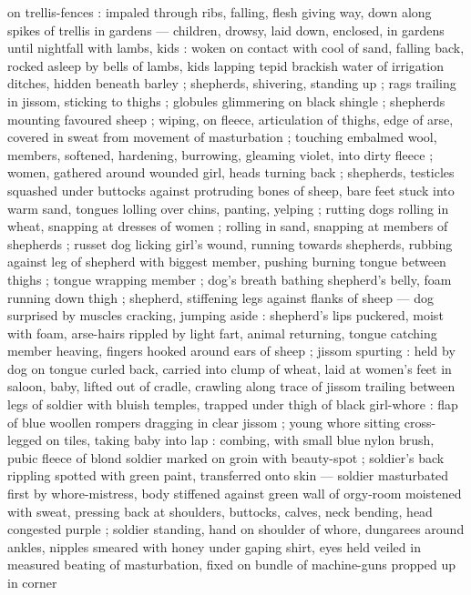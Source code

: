 on trellis-fences : impaled through ribs, falling, flesh giving way, down along spikes of trellis in
gardens --- children, drowsy, laid down, enclosed, in gardens until nightfall with lambs, kids :
woken on contact with cool of sand, falling back, rocked asleep by bells of lambs, kids lapping
tepid brackish water of irrigation ditches, hidden beneath barley ; shepherds, shivering, standing
up ; rags trailing in jissom, sticking to thighs ; globules glimmering on black shingle ; shepherds
mounting favoured sheep ; wiping, on fleece, articulation of thighs, edge of arse, covered in sweat
from movement of masturbation ; touching embalmed wool, members, softened, hardening, burrowing,
gleaming violet, into dirty fleece ; women, gathered around wounded girl, heads turning back ;
shepherds, testicles squashed under buttocks against protruding bones of sheep, bare feet stuck into
warm sand, tongues lolling over chins, panting, yelping ; rutting dogs rolling in wheat, snapping at
dresses of women ; rolling in sand, snapping at members of shepherds ; russet dog licking girl's
wound, running towards shepherds, rubbing %
against leg of shepherd with biggest member, pushing burning tongue between thighs ; tongue wrapping
member ; dog's breath bathing shepherd's belly, foam running down thigh ; shepherd, stiffening legs
against flanks of sheep --- dog surprised by muscles cracking, jumping aside : shepherd's lips
puckered, moist with foam, arse-hairs rippled by light fart, animal returning, tongue catching
member {\dashcom} heaving, fingers hooked around ears of sheep ; jissom spurting : held by dog on
tongue curled back, carried into clump of wheat, laid at women's feet {\semislash} in saloon, baby,
lifted out of cradle, crawling along trace of jissom trailing between legs of soldier with bluish
temples, trapped under thigh of black girl-whore : flap of blue woollen rompers dragging in clear
jissom ; young whore sitting cross-legged on tiles, taking baby into lap : combing, with small blue
nylon brush, pubic fleece of blond soldier marked on groin with beauty-spot ; soldier's back
rippling spotted with green paint, transferred onto skin --- soldier masturbated first by
whore-mistress, body stiffened against green wall of orgy-room moistened with sweat, pressing back
at shoulders, buttocks, calves, neck bending, head congested purple ; soldier standing, hand on
shoulder of whore, dungarees around ankles, nipples smeared with honey under gaping shirt, eyes held
veiled in measured beating of masturbation, fixed on bundle of machine-guns propped up in corner

